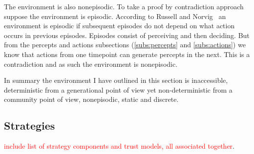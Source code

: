 \documentclass[]{final_report}
\begin{document}
The environment is also nonepisodic. To take a proof by contradiction approach suppose the environment is episodic. According to Russell and Norvig~\cite{russell2016artificial} an environment is episodic if subsequent episodes do not depend on what action occurs in previous episodes. Episodes consist of perceiving and then deciding. But from the percepts and actions subsections (\ref{subs:percepts} and \ref{subs:actions}) we know that actions from one timepoint can generate percepts in the next. This is a contradiction and as such the environment is nonepisodic.\par
In summary the environment I have outlined in this section is inaccessible, deterministic from a generational point of view yet non-deterministic from a community point of view, nonepisodic, static and discrete.
\subsection{Strategies}
\label{appendix:strats}
\textcolor{red}{include list of strategy components and trust models, all associated together}.
\end{document}
